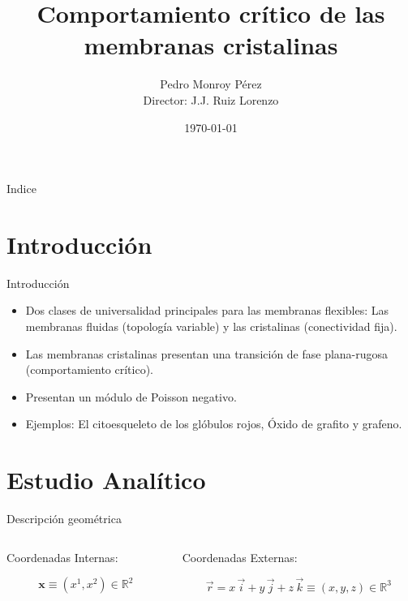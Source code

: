 \documentclass[xcolor=dvipsnames]{beamer}
\title[C. crítico de las membranas cristalinas]{Comportamiento crítico de las membranas cristalinas}
\author[P. Monroy Dir.: Juan J.Ruiz Lorenzo]{Pedro Monroy Pérez \\ Director:
  J.J. Ruiz Lorenzo}
\date{\today}
\institute[UEx]{Dep. de Física, Facultad de Ciencias, Universidad de Extremadura}
\begin{document}
\decimalpoint
\begin{frame}[plain]{}
\titlepage
\end{frame}


\begin{frame}{Indice}
  \tableofcontents[hideallsubsections]
\end{frame}
\section{Introducción}
\begin{frame}{Introducción}
\begin{itemize}
\item Dos clases de universalidad principales para las membranas flexibles:
  Las membranas fluidas (topología variable) y las cristalinas (conectividad fija). 
\item Las membranas cristalinas presentan una transición de fase plana-rugosa
  (comportamiento crítico).
\item Presentan un módulo de Poisson negativo.
\item Ejemplos: El citoesqueleto de los glóbulos rojos, Óxido de grafito y grafeno. 
\end{itemize}
\end{frame}
\section{Estudio Analítico}

\begin{frame}{Descripción geométrica}
  \begin{columns}
    \begin{column}{5.8cm}
      \centering
      Coordenadas Internas:
      \begin{figure}[h]
        \resizebox{\columnwidth}{!}{}
      \end{figure}
      \begin{equation*}
        \mathbf{x}\equiv (x^1,x^2)\in \mathbb{R}^2
      \end{equation*}
    \end{column}
    \begin{column}{5.8cm}
      \centering
      Coordenadas Externas:
      \begin{figure}[h]
        \resizebox{\columnwidth}{!}{}
      \end{figure}
      \begin{equation*}
        \vec{r}=x\,\vec{i}+y\,\vec{j}+z\,\vec{k}\equiv (x,y,z)\in \mathbb{R}^3
      \end{equation*}
    \end{column}
  \end{columns}
\end{frame}
\end{document}
